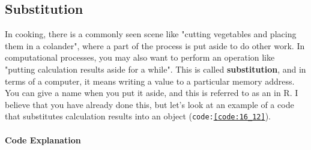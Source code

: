 \documentclass{ltjsbook}
\begin{document}
\subsection{Substitution}
In cooking, there is a commonly seen scene like "cutting vegetables and placing them in a colander", where a part of the process is put aside to do other work. In computational processes, you may also want to perform an operation like "putting calculation results aside for a while". This is called \textbf{substitution}, and in terms of a computer, it means writing a value to a particular memory address. You can give a name when you put it aside, and this is referred to as an  in R. I believe that you have already done this, but let's look at an example of a code that substitutes calculation results into an object (\texttt{code:\ref{code:16_12}}).



\paragraph{Code Explanation}

\end{document}
